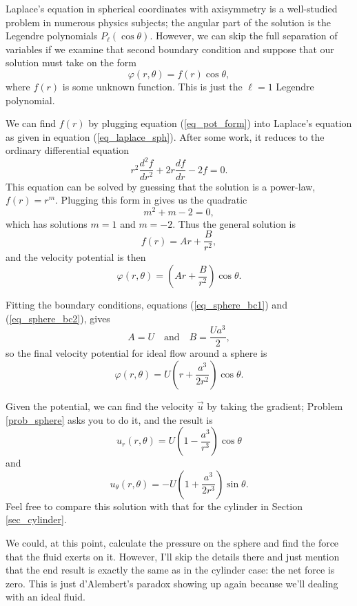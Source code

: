Laplace's equation in spherical coordinates with axisymmetry is a well-studied problem in numerous physics subjects; the angular part of the solution is the Legendre polynomials $P_\ell (\cos\theta)$.  However, we can skip the full separation of variables if we examine that second boundary condition and suppose that our solution must take on the form
\begin{equation}
\label{eq_pot_form}
\varphi(r, \theta) = f(r) \cos \theta,
\end{equation}
where $f(r)$ is some unknown function.  This is just the $\ell = 1$ Legendre polynomial.  

We can find $f(r)$ by plugging equation (\ref{eq_pot_form}) into Laplace's equation as given in equation (\ref{eq_laplace_sph}).  After some work, it reduces to the ordinary differential equation
\begin{equation}
r^2 \frac{d^2f}{dr^2} + 2r \frac{df}{dr} - 2f = 0.
\end{equation}
This equation can be solved by guessing that the solution is a power-law, $f(r) = r^m$.  Plugging this form in gives us the quadratic
\[
m^2 + m - 2 = 0,
\]
which has solutions $m = 1$ and $m = -2$.  Thus the general solution is
\[
f(r) = Ar + \frac{B}{r^2},
\]
and the velocity potential is then
\[
\varphi(r, \theta) = \left(Ar + \frac{B}{r^2} \right) \cos \theta.
\]

Fitting the boundary conditions, equations (\ref{eq_sphere_bc1}) and (\ref{eq_sphere_bc2}), gives
\[
A = U \quad \text{and} \quad B = \frac{Ua^3}{2},
\]
so the final velocity potential for ideal flow around a sphere is
\begin{equation}
\label{eq_sphere_pot}
\varphi(r, \theta) = U \left( r + \frac{a^3}{2r^2} \right) \cos \theta.
\end{equation}

Given the potential, we can find the velocity $\vec{u}$ by taking the gradient; Problem \ref{prob_sphere} asks you to do it, and the result is
\begin{equation}
u_r(r, \theta) = U \left( 1 - \frac{a^3}{r^3} \right) \cos \theta
\end{equation}
and
\begin{equation}
u_\theta(r, \theta) = -U \left( 1 + \frac{a^3}{2r^3} \right) \sin \theta.
\end{equation}
Feel free to compare this solution with that for the cylinder in Section \ref{sec_cylinder}.  

We could, at this point, calculate the pressure on the sphere and find the force that the fluid exerts on it.  However, I'll skip the details there and just mention that the end result is exactly the same as in the cylinder case:  the net force is zero.  This is just d'Alembert's paradox showing up again because we'll dealing with an ideal fluid.

